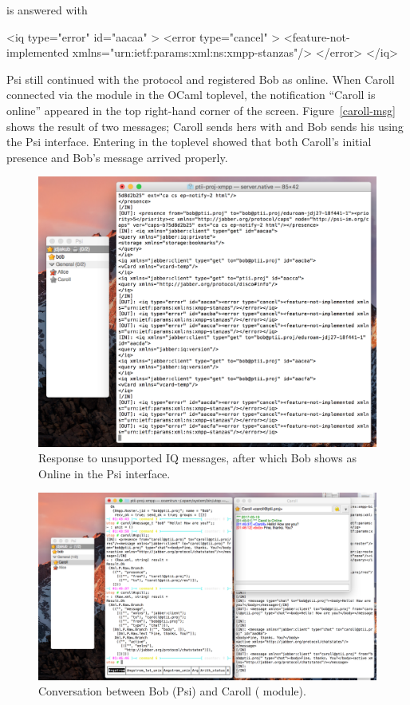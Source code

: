 is answered with

\begin{xml}
<iq type="error" id="aacaa" >
  <error type="cancel" >
    <feature-not-implemented xmlns="urn:ietf:params:xml:ns:xmpp-stanzas"/>
  </error>
</iq>
\end{xml}

Psi still continued with the protocol and registered Bob as online. When Caroll connected via the  module in the OCaml toplevel, the notification ``Caroll is online'' appeared in the top right-hand corner of the screen. Figure~\ref{caroll-msg} shows the result of two messages; Caroll sends hers with  and Bob sends his using the Psi interface. Entering  in the toplevel showed that both Caroll's initial presence and Bob's message arrived properly.

\begin{figure}
  \centering\includegraphics[width=\textwidth]{../transcripts/iq_errors.png}
  \caption{Response to unsupported IQ messages, after which Bob shows as Online in the Psi interface.}
  \label{fig:iq-errors}
\end{figure}

\begin{figure}
  \centering\includegraphics[width=\textwidth]{../transcripts/caroll_msg.png}
  \caption{Conversation between Bob (Psi) and Caroll ( module).}
  \label{fig:caroll-msg}
\end{figure}

